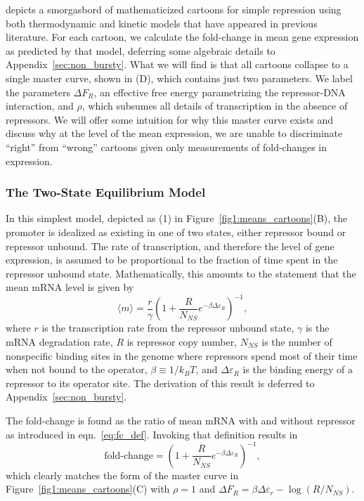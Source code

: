  depicts a smorgasbord of mathematicized cartoons for
simple repression using both thermodynamic and kinetic models that have appeared
in previous literature. For each cartoon, we calculate the fold-change in mean
gene expression as predicted by that model, deferring some algebraic details to
Appendix~\ref{sec:non_bursty}. What we will find is that all cartoons collapse
to a single master curve, shown in (D), which contains
just two parameters. We label the parameters $\Delta F_R$, an effective free
energy parametrizing the repressor-DNA interaction, and $\rho$, which subsumes
all details of transcription in the absence of repressors. We will offer some
intuition for why this master curve exists and discuss why at the level of the
mean expression, we are unable to discriminate ``right'' from ``wrong'' cartoons
given only measurements of fold-changes in expression.

\subsubsection{The Two-State Equilibrium Model}
In this simplest model, depicted as (1) in Figure~\ref{fig1:means_cartoons}(B),
the promoter is idealized as existing in one of two states, either repressor
bound or repressor unbound. The rate of transcription, and therefore the level
of gene expression, is assumed to be proportional to the fraction of time spent
in the repressor unbound state. Mathematically, this amounts to the statement
that the mean mRNA level is given by
\begin{equation}
\langle m \rangle = \frac{r}{\gamma}
        \left(1 + \frac{R}{N_{NS}} e^{-\beta\Delta\varepsilon_R}\right)^{-1},
\end{equation}
where $r$ is the transcription rate from the repressor unbound state, $\gamma$
is the mRNA degradation rate, $R$ is repressor copy number, $N_{NS}$ is the
number of nonspecific binding sites in the genome where repressors spend most
of their time when not bound to the operator, $\beta \equiv 1/k_BT$, and
$\Delta\varepsilon_R$ is the binding energy of a repressor to its operator site.
The derivation of this result is deferred to Appendix~\ref{sec:non_bursty}.

The fold-change is  found as the ratio of mean mRNA with and without repressor
as introduced in eqn.~\ref{eq:fc_def}. Invoking that definition results in
\begin{equation}
\text{fold-change}
= \left(1 + \frac{R}{N_{NS}} e^{-\beta\Delta\varepsilon_R}\right)^{-1},
\end{equation}
which clearly matches the form of the master curve in
Figure~\ref{fig1:means_cartoons}(C) with $\rho=1$ and $\Delta F_R = 
\beta\Delta\varepsilon_r - \log (R / N_{NS})$.


